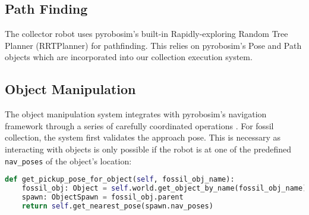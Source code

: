 \documentclass{csfourzero}
\begin{document}
\subsection{Path Finding}

The collector robot uses pyrobosim's built-in Rapidly-exploring Random Tree Planner (RRTPlanner) for pathfinding.
This relies on pyrobosim's Pose and Path objects which are incorporated into our collection execution system.

\subsection{Object Manipulation}

The object manipulation system integrates with pyrobosim's navigation framework through a series of carefully coordinated operations \cite{Khatib1986}. For fossil collection, the system first validates the approach pose. This is necessary as interacting with objects is only possible if the robot is at one of the predefined \verb|nav_poses| of the object's location:

\begin{lstlisting}[language=Python]
def get_pickup_pose_for_object(self, fossil_obj_name):
    fossil_obj: Object = self.world.get_object_by_name(fossil_obj_name)
    spawn: ObjectSpawn = fossil_obj.parent
    return self.get_nearest_pose(spawn.nav_poses)
\end{lstlisting}



\end{document}

